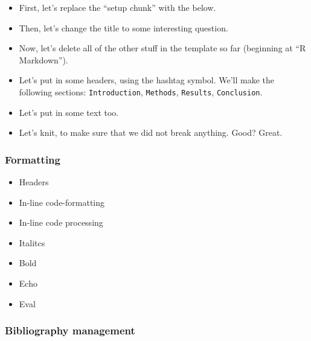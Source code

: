 \documentclass[
]{book}
\providecommand{\tightlist}{%
  \setlength{\itemsep}{0pt}\setlength{\parskip}{0pt}}
\begin{document}
\begin{itemize}
\item
  First, let's replace the ``setup chunk'' with the below.
\item
  Then, let's change the title to some interesting question.\\
\item
  Now, let's delete all of the other stuff in the template so far (beginning at ``R Markdown'').\\
\item
  Let's put in some headers, using the hashtag symbol. We'll make the following sections: \texttt{Introduction}, \texttt{Methods}, \texttt{Results}, \texttt{Conclusion}.\\
\item
  Let's put in some text too.\\
\item
  Let's knit, to make sure that we did not break anything. Good? Great.
\end{itemize}

\hypertarget{formatting}{%
\subsubsection*{Formatting}\label{formatting}}

\begin{itemize}
\tightlist
\item
  Headers\\
\item
  In-line code-formatting\\
\item
  In-line code processing\\
\item
  Italitcs\\
\item
  Bold\\
\item
  Echo\\
\item
  Eval
\end{itemize}

\hypertarget{bibliography-management}{%
\subsubsection*{Bibliography management}\label{bibliography-management}}
\end{document}
